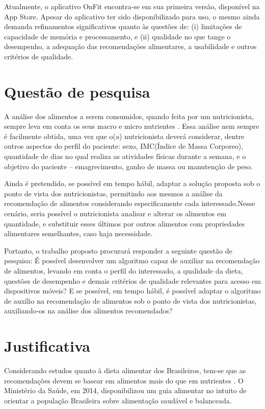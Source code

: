 Atualmente, o aplicativo OnFit encontra-se em sua primeira versão, disponível
na App Store. Apesar do aplicativo ter sido disponibilizado para uso, o mesmo ainda
demanda refinamentos significativos quanto às questões de: (i) limitações de capacidade
de memória e processamento, e (ii) qualidade no que tange o desempenho, a adequação
das recomendações alimentares, a usabilidade e outros critérios de qualidade.

\section{Questão de pesquisa}

A análise dos alimentos a serem consumidos, quando feita por um nutricionista,
sempre leva em conta os seus macro e micro nutrientes \cite{entrevista_aline}. Essa análise nem sempre é
facilmente obtida, uma vez que o(a) nutricionista deverá considerar, dentre outros
aspectos do perfil do paciente: sexo, IMC(Índice de Massa Corporeo), quantidade de
dias no qual realiza as atividades físicas durante a semana, e o objetivo do paciente –
emagrecimento, ganho de massa ou manutenção de peso.

Ainda é pretendido, se possível em tempo hábil,  adaptar a solução proposta sob o ponto de vista dos nutricionistas, permitindo aos mesmos a análise da recomendação de alimentos considerando especificamente cada interessado.Nesse cenário, seria possível o nutricionista analisar e alterar os alimentos em
quantidade, e substituir esses últimos por outros alimentos com propriedades alimentares
semelhantes, caso haja necessidade.

Portanto, o trabalho proposto procurará responder a seguinte questão de pesquisa: É possível desenvolver um algoritmo capaz de auxiliar na recomendação de alimentos, levando em conta o perfil do interessado, a qualidade da dieta, questões de desempenho e demais critérios de qualidade relevantes para acesso em dispositivos móveis? E se possível, em tempo hábil, é possível adaptar o algoritmo de auxílio na recomendação de alimentos sob o ponto de vista dos nutricionistas, auxiliando-os na análise dos alimentos recomendados?

\section{Justificativa}

Considerando estudos quanto à dieta alimentar dos Brasileiros, tem-se que as
recomendações devem se basear em alimentos mais do que em nutrientes \cite{art_alimentacao_saudavel} . O
Ministério da Saúde, em 2014, disponibilizou um guia alimentar \cite{guia_alimentar} no intuito de
orientar a população Brasileira sobre alimentação saudável e balanceada.

